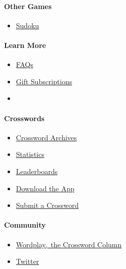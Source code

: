 \hypertarget{other-games-1}{%
\paragraph{Other Games}\label{other-games-1}}

\begin{itemize}
\tightlist
\item
  \href{/puzzles/sudoku}{Sudoku}
\end{itemize}

\hypertarget{learn-more}{%
\paragraph{Learn More}\label{learn-more}}

\begin{itemize}
\item
  \href{https://nytimes.com/content/help/games/crosswords/crosswords.html}{FAQs}
\item
  \href{https://nytimes.com/subscription/games/lp3HLK7.html}{Gift
  Subscriptions}
\item
\end{itemize}

\hypertarget{crosswords}{%
\paragraph{Crosswords}\label{crosswords}}

\begin{itemize}
\tightlist
\item
  \href{/crosswords/archive}{Crossword Archives}
\item
  \href{/puzzles/stats}{Statistics}
\item
  \href{/puzzles/leaderboards}{Leaderboards}
\item
  \href{/crosswords/apps}{Download the App}
\item
  \href{/puzzles/submissions/crossword}{Submit a Crossword}
\end{itemize}

\hypertarget{community}{%
\paragraph{Community}\label{community}}

\begin{itemize}
\tightlist
\item
  \href{https://nytimes.com/column/wordplay}{Wordplay,~the Crossword
  Column}
\item
  \href{https://twitter.com/NYTimesWordplay}{Twitter}
\end{itemize}

